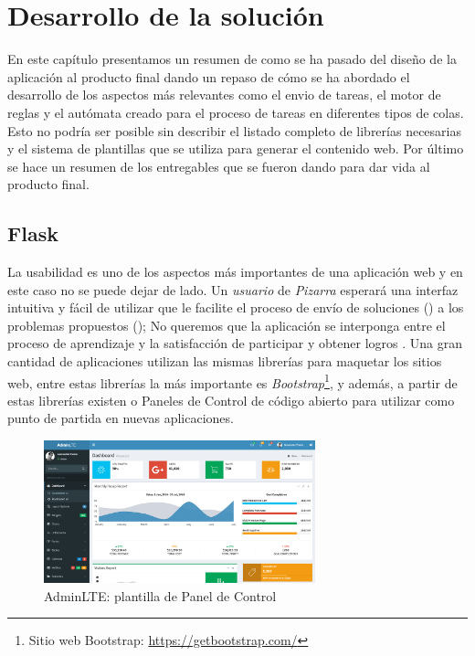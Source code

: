 \documentclass[11pt,spanish,listoffigures,listoftables]{tfgetsinf}
\begin{document}
\chapter{Desarrollo de la solución}

En este capítulo presentamos un resumen de como se ha pasado del diseño de la aplicación al producto final dando un repaso de cómo se ha abordado el desarrollo de los aspectos más relevantes como el \gls{envio} de \gls{tarea}s, el motor de reglas y el autómata creado para el proceso de tareas en diferentes tipos de \gls{cola}s. Esto no podría ser posible sin describir el listado completo de librerías necesarias y el sistema de plantillas que se utiliza para generar el contenido web. Por último se hace un resumen de los entregables que se fueron dando para dar vida al producto final.

\section{Flask }

La usabilidad es uno de los aspectos más importantes de una aplicación web y en este caso no se puede dejar de lado. Un \textit{usuario} de \textit{Pizarra} esperará una interfaz intuitiva y fácil de utilizar que le facilite el proceso de envío de soluciones () a los problemas propuestos (); No queremos que la aplicación se interponga entre el proceso de aprendizaje y la satisfacción de participar y obtener logros . Una gran cantidad de aplicaciones utilizan las mismas librerías para maquetar los sitios web, entre estas librerías la más importante es \textit{Bootstrap}\footnote{Sitio web Bootstrap: \url{https://getbootstrap.com/}}, y además, a partir de estas librerías existen  o Paneles de Control de código abierto para utilizar como punto de partida en nuevas aplicaciones.
	

\begin{figure}[!ht]
	\centering
	\includegraphics[width=0.70\textwidth]{img/admin-lte}
	\caption[AdminLTE: plantilla de Panel de Control ]{AdminLTE: plantilla de Panel de Control}
	\label{figura:admin-lte}
\end{figure}
\end{document}
